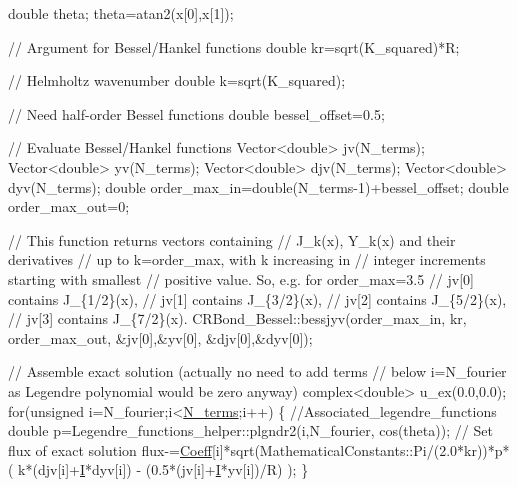 \begin{DoxyCodeInclude}
  \textcolor{keywordtype}{double} theta;
  theta=atan2(x[0],x[1]);
  
  \textcolor{comment}{// Argument for Bessel/Hankel functions}
  \textcolor{keywordtype}{double} kr=sqrt(K\_squared)*R;  

  \textcolor{comment}{// Helmholtz wavenumber}
  \textcolor{keywordtype}{double} k=sqrt(K\_squared);

  \textcolor{comment}{// Need half-order Bessel functions}
  \textcolor{keywordtype}{double} bessel\_offset=0.5;

  \textcolor{comment}{// Evaluate Bessel/Hankel functions}
  Vector<double> jv(N\_terms);
  Vector<double> yv(N\_terms);
  Vector<double> djv(N\_terms);
  Vector<double> dyv(N\_terms);
  \textcolor{keywordtype}{double} order\_max\_in=double(N\_terms-1)+bessel\_offset;
  \textcolor{keywordtype}{double} order\_max\_out=0;
  
  \textcolor{comment}{// This function returns vectors containing }
  \textcolor{comment}{// J\_k(x), Y\_k(x) and their derivatives}
  \textcolor{comment}{// up to k=order\_max, with k increasing in}
  \textcolor{comment}{// integer increments starting with smallest}
  \textcolor{comment}{// positive value. So, e.g. for order\_max=3.5}
  \textcolor{comment}{// jv[0] contains J\_\{1/2\}(x),}
  \textcolor{comment}{// jv[1] contains J\_\{3/2\}(x),}
  \textcolor{comment}{// jv[2] contains J\_\{5/2\}(x),}
  \textcolor{comment}{// jv[3] contains J\_\{7/2\}(x).}
  CRBond\_Bessel::bessjyv(order\_max\_in,
                         kr,
                         order\_max\_out,
                         &jv[0],&yv[0],
                         &djv[0],&dyv[0]);
  
  
  \textcolor{comment}{// Assemble  exact solution (actually no need to add terms}
  \textcolor{comment}{// below i=N\_fourier as Legendre polynomial would be zero anyway)}
  complex<double> u\_ex(0.0,0.0);
  \textcolor{keywordflow}{for}(\textcolor{keywordtype}{unsigned} i=N\_fourier;i<\hyperlink{namespacePlanarWave_a56abdb2474ccaffd88346ee3607d8672}{N\_terms};i++)
   \{
    \textcolor{comment}{//Associated\_legendre\_functions}
    \textcolor{keywordtype}{double} p=Legendre\_functions\_helper::plgndr2(i,N\_fourier,
                                                cos(theta));
    \textcolor{comment}{// Set flux of exact solution}
    flux-=\hyperlink{namespaceProblemParameters_acb1788444ef78fe2adec824504f24246}{Coeff}[i]*sqrt(MathematicalConstants::Pi/(2.0*kr))*p*
     ( k*(djv[i]+\hyperlink{namespacePlanarWave_a541691caf71477c8c389062797c0fdab}{I}*dyv[i]) - (0.5*(jv[i]+\hyperlink{namespacePlanarWave_a541691caf71477c8c389062797c0fdab}{I}*yv[i])/R) );
   \}
  

\end{DoxyCodeInclude}
